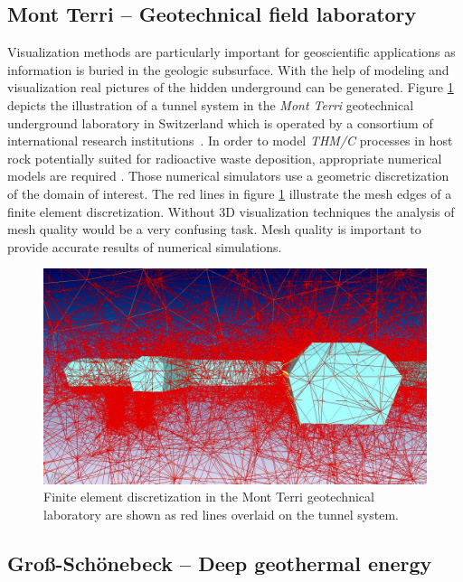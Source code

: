 \documentclass[twocolumn]{svjour3}          %
\begin{document}
\subsection{Mont Terri -- Geotechnical field laboratory}
\label{Mont Terri -- Geotechnical Field Laboratory}

Visualization methods are particularly important for geoscientific applications as information is buried in the geologic subsurface. With the help of modeling and visualization real pictures of the hidden underground can be generated. Figure \ref{fig:mont-terri} depicts the illustration of a tunnel system in the \emph{Mont Terri} geotechnical underground laboratory in Switzerland which is operated by a consortium of international research institutions~\cite{web:mont-terri}. In order to model \emph{THM/C} processes in host rock potentially suited for radioactive waste deposition, appropriate numerical models are required \cite{ Kolditz2004345, Shao20091287, Xie2006122}. Those numerical simulators use a geometric discretization of the domain of interest. The red lines in figure \ref{fig:mont-terri} illustrate the mesh edges of a finite element discretization. Without 3D visualization techniques the analysis of mesh quality would be a very confusing task. Mesh quality is important to provide accurate results of numerical simulations.

\begin{figure}[htb]
  \includegraphics[width=\linewidth]{images/mont-terri.jpg}
\caption{Finite element discretization in the Mont Terri geotechnical laboratory are shown as red lines overlaid on the tunnel system.}
\label{fig:mont-terri}
\end{figure}

\subsection{Gro{\ss}-Sch\"onebeck -- Deep geothermal energy}
\label{grouss-schoenebeck---geothermal-energy}
\end{document}
